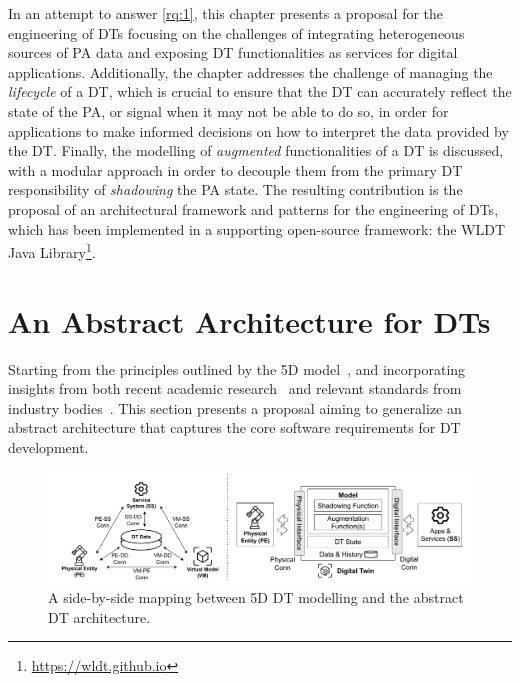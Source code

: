 In an attempt to answer \ref{rq:1}, 
this chapter presents a proposal for the engineering of \acp{DT}
focusing on the challenges of integrating heterogeneous sources of \ac{PA} data
and exposing \ac{DT} functionalities as services for digital applications.
%
Additionally, the chapter addresses the challenge of managing the \emph{lifecycle} of a \ac{DT}, 
which is crucial to ensure that the \ac{DT} can accurately reflect the state of the \ac{PA}, 
or signal when it may not be able to do so, in order for applications to make informed decisions on how to 
interpret the data provided by the \ac{DT}.
%
Finally, the modelling of \emph{augmented} functionalities of a \ac{DT} is discussed, with a modular approach
in order to decouple them from the primary \ac{DT} responsibility of \emph{shadowing} the \ac{PA} state. 
%
The resulting contribution is the proposal of an architectural framework and patterns for the engineering of \acp{DT}, 
which has been implemented in a supporting open-source framework: the \ac{WLDT} Java Library\footnote{\url{https://wldt.github.io}}.

\section{An Abstract Architecture for \aclp{DT}}
\label{sec:dte:engineering-dt:abstract-architecture}
Starting from the principles outlined by the 5D model~\cite{dt-driven-prognostics-tao-2018},
and incorporating insights from both recent academic research~\cite{web-of-dt-ricci-2022,Bellavista_Bicocchi_Fogli_Giannelli_Mamei_Picone_2023} and relevant standards from industry bodies~\cite{etsi-dt-comm-requirements-2024}.
This section presents a proposal aiming to generalize an abstract architecture that captures the core software requirements for \ac{DT} development.

\begin{figure}[t]
    \centering
    \includegraphics[width=\textwidth]{figures/mapping-Tao-WLDT.pdf}
    \caption{A side-by-side mapping between 5D DT modelling and the abstract \ac{DT} architecture.}
    \label{fig:tao_mapping_dt_modelling}
\end{figure}

